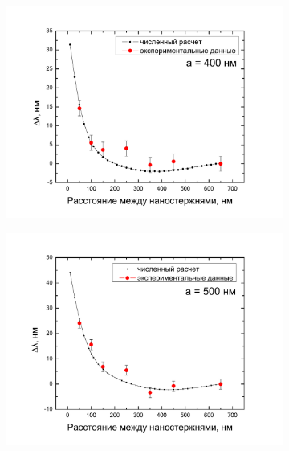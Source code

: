 
\begin{figure}
\centering
\begin{subfigure}{.5\textwidth}
  \centering
  \includegraphics[width=1\linewidth]{img/microspectroscopy/a400shift.pdf}
\end{subfigure}%
\begin{subfigure}{.5\textwidth}
  \centering
  \includegraphics[width=1\linewidth]{img/microspectroscopy/a500shift.pdf}

\end{subfigure}
\end{figure}
